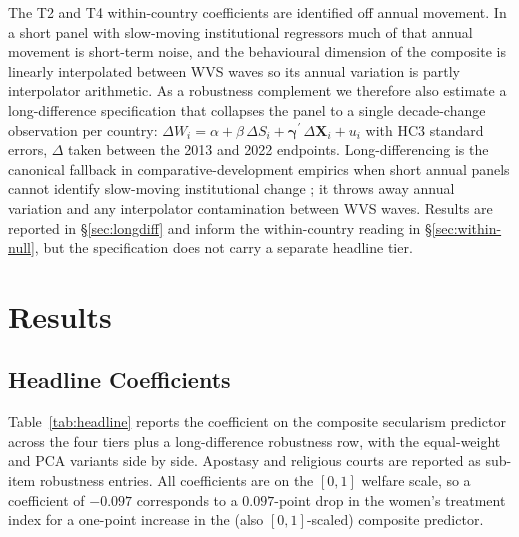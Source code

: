 \documentclass[12pt,a4paper]{article}
\begin{document}
The T2 and T4 within-country coefficients are identified off annual movement. In a short panel with slow-moving institutional regressors much of that annual movement is short-term noise, and the behavioural dimension of the composite is linearly interpolated between WVS waves so its annual variation is partly interpolator arithmetic. As a robustness complement we therefore also estimate a long-difference specification that collapses the panel to a single decade-change observation per country: $\Delta W_i = \alpha + \beta\,\Delta S_i + \boldsymbol{\gamma}^{\prime}\,\Delta\mathbf{X}_i + u_i$ with HC3 standard errors, $\Delta$ taken between the 2013 and 2022 endpoints. Long-differencing is the canonical fallback in comparative-development empirics when short annual panels cannot identify slow-moving institutional change \citep{AcemogluJohnsonRobinsonYared2008, BesleyPersson2011}; it throws away annual variation and any interpolator contamination between WVS waves. Results are reported in \S\ref{sec:longdiff} and inform the within-country reading in \S\ref{sec:within-null}, but the specification does not carry a separate headline tier.

\section{Results}

\subsection{Headline Coefficients}

Table~\ref{tab:headline} reports the coefficient on the composite secularism predictor across the four tiers plus a long-difference robustness row, with the equal-weight and PCA variants side by side. Apostasy and religious courts are reported as sub-item robustness entries. All coefficients are on the $[0, 1]$ welfare scale, so a coefficient of $-0.097$ corresponds to a $0.097$-point drop in the women's treatment index for a one-point increase in the (also $[0, 1]$-scaled) composite predictor.
\end{document}
